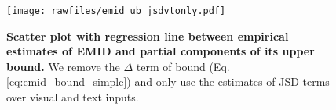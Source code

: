 \begin{figure}[!ht]
    \vspace{-0.65em}
    \centering
    \texttt{[image: rawfiles/emid\_ub\_jsdvtonly.pdf]}
    \vspace{-0.7em}
    \caption{\textbf{Scatter plot with regression line between empirical estimates of EMID and partial components of its upper bound.} We remove the $\Delta$ term of bound (Eq. \eqref{eq:emid_bound_simple}) and only use the estimates of JSD terms over visual and text inputs. 
    }
    \label{fig:emid_partialub_scatter}
\end{figure}
